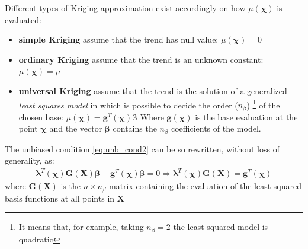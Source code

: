 Different types of Kriging approximation exist accordingly on how $\mu(\boldsymbol{\chi})$ is evaluated:
\begin{itemize}
	\item \textbf{simple Kriging} assume that the trend has null value: $\mu(\boldsymbol{\chi}) = 0$
	\item \textbf{ordinary Kriging} assume that the trend is an unknown constant: $\mu(\boldsymbol{\chi}) = \mu$
	\item \textbf{universal Kriging} assume that the trend is the solution of a generalized \textit{least squares model} in which is possible to decide the order ($n_{\beta}$) \footnote{It means that, for example, taking $n_{\beta}= 2$ the least squared model is quadratic} of the chosen base: $\mu(\boldsymbol{\chi}) = \mathbf{g}^T(\boldsymbol{\chi}) \boldsymbol{\beta}$
	Where $\mathbf{g}(\boldsymbol{\chi})$ is the base evaluation at the point $\boldsymbol{\chi}$ and the vector $\boldsymbol{\beta}$ contains the $n_{\beta}$ coefficients of the model.
\end{itemize}

The unbiased condition \eqref{eq:unb_cond2} can be so rewritten, without loss of generality, as:
\begin{eqnarray}
 \boldsymbol{ \lambda}^T (\boldsymbol{\chi}) \mathbf{G}(\mathbf{X}) \boldsymbol{\beta} - \mathbf{g}^T(\boldsymbol{\chi}) \boldsymbol{\beta} = 0 \Longrightarrow \boldsymbol{\lambda}^T(\boldsymbol{\chi}) \mathbf{G}(\mathbf{X}) = \mathbf{g}^T(\boldsymbol{\chi})
\end{eqnarray}
where $\mathbf{G}(\mathbf{X})$ is the $n \times n_{\beta}$ matrix containing the evaluation of the least squared basis functions at all points in $\mathbf{X}$


